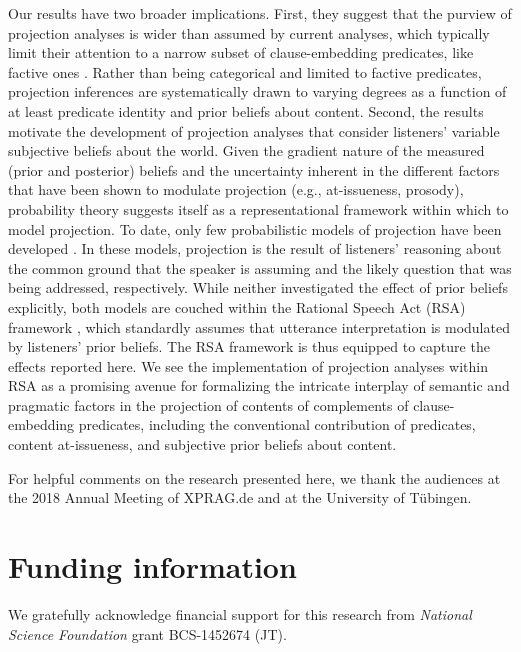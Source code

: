\documentclass[OpenMind]{stjour}
\begin{document}
Our results have two broader implications. First, they suggest that the purview of projection analyses is wider than assumed by current analyses, which typically limit their attention to a narrow subset of clause-embedding predicates, like factive ones \citep[e.g.,][]{heim83,vds92,abrusan2011,abrusan2016,romoli2015,best-question}. Rather than being categorical and limited to factive predicates, projection inferences are systematically drawn to varying degrees as a function of at least predicate identity and prior beliefs about content. Second, the results motivate the development of projection analyses that consider listeners' variable subjective beliefs about the world. Given the gradient nature of the measured (prior and posterior) beliefs and the uncertainty inherent in the different factors that have been shown to modulate projection (e.g., at-issueness, prosody), probability theory suggests itself as a representational framework within which to model projection. To date, only few probabilistic models of  projection have been developed \citep{qing2016, stevens-etal2017}. In these models, projection is the result of listeners' reasoning about the common ground that the speaker is assuming and the likely question that was being addressed, respectively. While neither investigated the effect of prior beliefs explicitly, both models are couched within the Rational Speech Act (RSA) framework \citep{frankejaeger2016,GoodmanFrank2016}, which standardly assumes that utterance interpretation is modulated by listeners' prior beliefs. The RSA framework is thus equipped to capture the effects reported here. We see the implementation of projection analyses within RSA as a promising avenue for formalizing the intricate interplay of semantic and pragmatic factors in the projection of contents of complements of clause-embedding predicates, including the conventional contribution of predicates, content at-issueness, and subjective prior beliefs about content.



\acknowledgments

For helpful comments on the research presented here, we thank the audiences at the 2018 Annual Meeting of XPRAG.de and at the University of T\"ubingen.


\section{Funding information}

We gratefully acknowledge financial support for this research from {\em National Science Foundation} grant BCS-1452674 (JT).
\end{document}

